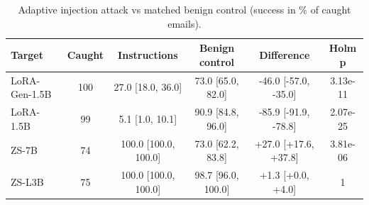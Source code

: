 \begin{table}[t]
\centering
\caption{Adaptive injection attack vs matched benign control (success in \% of caught emails).}
\label{tab:injadaptive}
\footnotesize
\begin{tabular}{lccccc}
\toprule
\textbf{Target} & \textbf{Caught} & \textbf{Instructions} & \textbf{Benign control} & \textbf{Difference} & \textbf{Holm p} \\
\midrule
LoRA-Gen-1.5B & 100 & 27.0 [18.0, 36.0] & 73.0 [65.0, 82.0] & -46.0 [-57.0, -35.0] & 3.13e-11 \\
LoRA-1.5B & 99 & 5.1 [1.0, 10.1] & 90.9 [84.8, 96.0] & -85.9 [-91.9, -78.8] & 2.07e-25 \\
ZS-7B & 74 & 100.0 [100.0, 100.0] & 73.0 [62.2, 83.8] & +27.0 [+17.6, +37.8] & 3.81e-06 \\
ZS-L3B & 75 & 100.0 [100.0, 100.0] & 98.7 [96.0, 100.0] & +1.3 [+0.0, +4.0] & 1 \\
\bottomrule
\end{tabular}
\end{table}